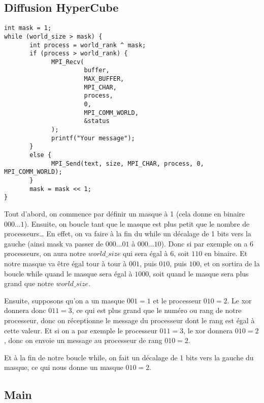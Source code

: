 \documentclass[11pt]{article}
\begin{document}
\subsection{Diffusion HyperCube}
\label{sec:org01389a0}
\begin{verbatim}
int mask = 1;
while (world_size > mask) {
       int process = world_rank ^ mask;
       if (process > world_rank) {
             MPI_Recv(
                      buffer,
                      MAX_BUFFER,
                      MPI_CHAR,
                      process,
                      0,
                      MPI_COMM_WORLD,
                      &status
             );
             printf("Your message");
       }
       else {
             MPI_Send(text, size, MPI_CHAR, process, 0, MPI_COMM_WORLD);
       }
       mask = mask << 1;
}
\end{verbatim}
Tout d'abord, on commence par définir un masque à 1 (cela donne en binaire \(000 \dots 1\)).
Ensuite, on boucle tant que le masque est plus petit que le nombre de processeurs\ldots{}
En effet, on va faire à la fin du while un décalage de 1 bits vers la gauche (ainsi mask va passer de \(000\dots01\) à \(000\dots10\)).
Donc si par exemple on a 6 processeurs, on aura notre \(world\_size\) qui sera égal à 6, soit \(110\) en binaire.
Et notre masque va être égal tour à tour à \(001\), puis \(010\), puis \(100\), et on sortira de la boucle while quand le masque sera égal à \(1000\),
soit quand le masque sera plus grand que notre \(world\_size\).

Ensuite, supposons qu'on a un masque \(001 = 1\) et le processeur \(010 = 2\). Le xor donnera donc \(011 = 3\), ce qui est plus grand que le numéro ou rang de notre processeur, donc on réceptionne le message
du processeur dont le rang est égal à cette valeur. Et si on a par exemple le processeur \(011 = 3\), le xor donnera \(010 = 2\), donc on envoie un message au processeur de rang \(010 = 2\).

Et à la fin de notre boucle while, on fait un décalage de 1 bits vers la gauche du masque, ce qui nous donne un masque \(010 = 2\).

\subsection{Main}
\label{sec:orge4a9c30}
\end{document}
